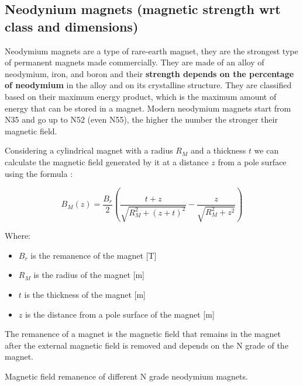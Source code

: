 \subsection{Neodynium magnets (magnetic strength wrt class and dimensions)}
Neodymium magnets are a type of rare-earth magnet, they are the strongest type of permanent magnets made commercially.
They are made of an alloy of neodymium, iron, and boron and their \textbf{strength depends on the percentage of neodymium} in the alloy and on its crystalline structure.
They are classified based on their maximum energy product, which is the maximum amount of energy that can be stored in a magnet. Modern neodymium magnets start from N35 and go up to N52 (even N55), the higher the number the stronger their magnetic field.

\begin{samepage}
    Considering a cylindrical magnet with a radius $R_M$ and a thickness $t$ we can calculate the magnetic field generated by it at a distance $z$ from a pole surface using the formula \cite{Magnetic_field_perm_magnet}:
    \nopagebreak

    \begin{equation}
        B_M(z) = \frac{B_r}{2} \left( \frac{t+z}{\sqrt{R_M^2+(z+t)^2}} - \frac{z}{\sqrt{R_M^2+z^2}} \right) \label{eq: Magnetic_field_perm_magnet}
    \end{equation}
    \nopagebreak

    Where: 
    \begin{itemize}
        \item $B_r$ is the remanence of the magnet [T]
        \item $R_M$ is the radius of the magnet [m]
        \item $t$ is the thickness of the magnet [m]
        \item $z$ is the distance from a pole surface of the magnet [m]
    \end{itemize}
\end{samepage}
    
\begin{samepage}
    The remanence of a magnet is the magnetic field that remains in the magnet after the external magnetic field is removed and depends on the N grade of the magnet.
    \nopagebreak

    \begin{table}[H]
        \centering
        \resizebox{.6\linewidth}{!}{}
        \caption{Magnetic field remanence of different N grade neodymium magnets.}
        \label{tab: magnet_grades}
    \end{table}
\end{samepage}
